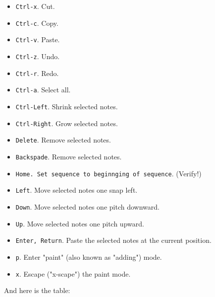    \begin{itemize}
      \item \texttt{Ctrl-x}. Cut.
      \item \texttt{Ctrl-c}. Copy.
      \item \texttt{Ctrl-v}. Paste.
      \item \texttt{Ctrl-z}. Undo.
      \item \texttt{Ctrl-r}. Redo.
      \item \texttt{Ctrl-a}. Select all.
      \item \texttt{Ctrl-Left}.  Shrink selected notes.
      \item \texttt{Ctrl-Right}.  Grow selected notes.
      \item \texttt{Delete}.  Remove selected notes.
      \item \texttt{Backspade}.  Remove selected notes.
      \item \texttt{Home.  Set sequence to beginnging of sequence}.  (Verify!)
      \item \texttt{Left}.  Move selected notes one snap left.
      \item \texttt{Down}.  Move selected notes one pitch downward.
      \item \texttt{Up}.  Move selected notes one pitch upward.
      \item \texttt{Enter, Return}.
         Paste the selected notes at the current position.
      \item \texttt{p}.  Enter "paint" (also known as "adding") mode.
      \item \texttt{x}.  Escape ("x-scape") the paint mode.
   \end{itemize}

   And here is the table:


